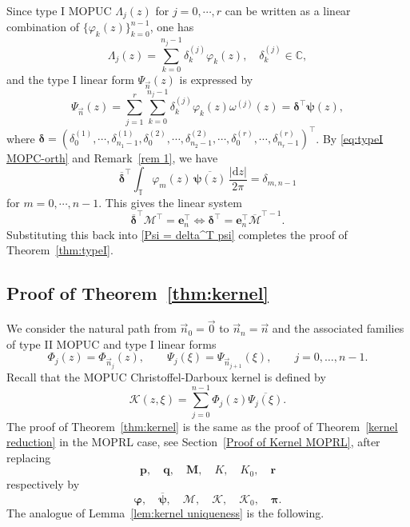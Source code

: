 \documentclass[a4paper,10pt,leqno]{amsart}
\numberwithin{equation}{section}
\theoremstyle{remark}
\newcommand{\dd}{\mathrm{d}}
\newcommand{\C}{\mathbb{C}}
\newcommand{\TT}{\mathbb{T}}
\begin{document}
Since type I MOPUC $\Lambda_j(z)$ for $j=0, \cdots, r$ can be written as a linear combination of \(\{\varphi_k(z)\}_{k=0}^{n-1}\), one has
\[
\Lambda_j(z) = \sum_{k=0}^{n_j-1} \delta_k^{(j)} \varphi_k(z), \quad \delta_k^{(j)} \in \C,
\]
and the type I linear form $\Psi_{\vec{n}}(z)$ is expressed by
\begin{equation} \label{Psi = delta^T psi}
    \Psi_{\vec{n}}(z) = \sum_{j=1}^{r} \sum_{k=0}^{n_j-1} \delta_k^{(j)} \varphi_k(z) \omega^{(j)}(z) = \bm{\delta}^\top \bm{\psi}(z),
\end{equation}
where \(\bm{\delta} = \left( \delta_0^{(1)}, \cdots, \delta_{n_1 - 1}^{(1)}, \delta_0^{(2)}, \cdots, \delta_{n_2 - 1}^{(2)}, \boldsymbol{\cdots}, \delta_0^{(r)}, \cdots, \delta_{n_r - 1}^{(r)} \right)^\top \).
By \eqref{eq:typeI MOPC-orth} and Remark~\ref{rem 1}, we have
\begin{equation}
    \overline{\bm{\delta}}^\top \int_{\TT} \varphi_m(z) \, \overline{\bm{\psi}(z)} \, \frac{|\dd z|}{2 \pi} = \delta_{m, n-1}
\end{equation}
for $m = 0, \cdots, n-1$. 
This gives the linear system
\begin{equation}\label{eq:Md-e}
\overline{\bm{\delta}}^\top \bm{\mathcal{M}}^\top  = \bm{e}_n^\top \iff
\bm{\delta}^\top = \bm{e}_n^\top \overline{\bm{\mathcal{M}}}^{\top-1}.
\end{equation}
Substituting this back into \eqref{Psi = delta^T psi} completes the proof of Theorem~\ref{thm:typeI}.


 


\subsection{Proof of Theorem~\ref{thm:kernel}}

 We consider the natural path from $\vec{n}_0=\vec{0}$ to $\vec{n}_n=\vec n$ and the associated
families of type II MOPUC and type I linear forms
\begin{equation}
    \Phi_j(z)=\Phi_{\vec n_j}(z),     \qquad \Psi_j(\xi)=\Psi_{\vec n_{j+1}}(\xi),  \qquad j=0,\ldots,n-1.
\end{equation}
Recall that the MOPUC Christoffel-Darboux kernel is defined by
\begin{equation}
    \mathcal K(z,\xi)=\sum_{j=0}^{n-1}\Phi_j(z)\overline{\Psi_j(\xi)}.
\end{equation}
The proof of Theorem~\ref{thm:kernel} is the same as the proof of Theorem~\ref{kernel reduction} in the MOPRL case, see
Section~\ref{Proof of Kernel MOPRL}, after replacing
\begin{equation}
    \bm p,\quad \bm q,\quad \bm M,\quad K,\quad K_0,\quad \bm r
\end{equation}
respectively by
\begin{equation}
    \bm\varphi,\quad \overline{\bm\psi},\quad \bm{\mathcal M},\quad \mathcal K,\quad \mathcal K_0,\quad \bm\pi.
\end{equation}
The analogue of Lemma~\ref{lem:kernel uniqueness} is the following.
\end{document}
